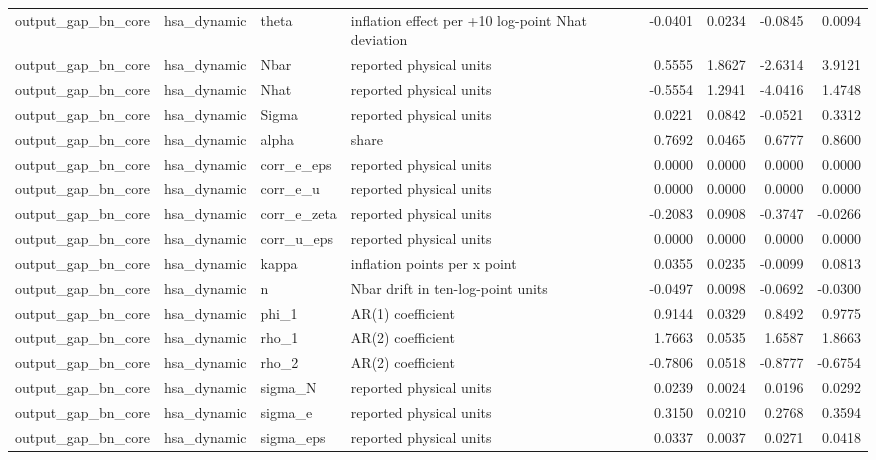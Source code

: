 \begin{tabular}{llllrrrr}
output\_gap\_bn\_core & hsa\_dynamic & theta & inflation effect per +10 log-point Nhat deviation & -0.0401 & 0.0234 & -0.0845 & 0.0094 \\
output\_gap\_bn\_core & hsa\_dynamic & Nbar & reported physical units & 0.5555 & 1.8627 & -2.6314 & 3.9121 \\
output\_gap\_bn\_core & hsa\_dynamic & Nhat & reported physical units & -0.5554 & 1.2941 & -4.0416 & 1.4748 \\
output\_gap\_bn\_core & hsa\_dynamic & Sigma & reported physical units & 0.0221 & 0.0842 & -0.0521 & 0.3312 \\
output\_gap\_bn\_core & hsa\_dynamic & alpha & share & 0.7692 & 0.0465 & 0.6777 & 0.8600 \\
output\_gap\_bn\_core & hsa\_dynamic & corr\_e\_eps & reported physical units & 0.0000 & 0.0000 & 0.0000 & 0.0000 \\
output\_gap\_bn\_core & hsa\_dynamic & corr\_e\_u & reported physical units & 0.0000 & 0.0000 & 0.0000 & 0.0000 \\
output\_gap\_bn\_core & hsa\_dynamic & corr\_e\_zeta & reported physical units & -0.2083 & 0.0908 & -0.3747 & -0.0266 \\
output\_gap\_bn\_core & hsa\_dynamic & corr\_u\_eps & reported physical units & 0.0000 & 0.0000 & 0.0000 & 0.0000 \\
output\_gap\_bn\_core & hsa\_dynamic & kappa & inflation points per x point & 0.0355 & 0.0235 & -0.0099 & 0.0813 \\
output\_gap\_bn\_core & hsa\_dynamic & n & Nbar drift in ten-log-point units & -0.0497 & 0.0098 & -0.0692 & -0.0300 \\
output\_gap\_bn\_core & hsa\_dynamic & phi\_1 & AR(1) coefficient & 0.9144 & 0.0329 & 0.8492 & 0.9775 \\
output\_gap\_bn\_core & hsa\_dynamic & rho\_1 & AR(2) coefficient & 1.7663 & 0.0535 & 1.6587 & 1.8663 \\
output\_gap\_bn\_core & hsa\_dynamic & rho\_2 & AR(2) coefficient & -0.7806 & 0.0518 & -0.8777 & -0.6754 \\
output\_gap\_bn\_core & hsa\_dynamic & sigma\_N & reported physical units & 0.0239 & 0.0024 & 0.0196 & 0.0292 \\
output\_gap\_bn\_core & hsa\_dynamic & sigma\_e & reported physical units & 0.3150 & 0.0210 & 0.2768 & 0.3594 \\
output\_gap\_bn\_core & hsa\_dynamic & sigma\_eps & reported physical units & 0.0337 & 0.0037 & 0.0271 & 0.0418 \\

\end{tabular}
